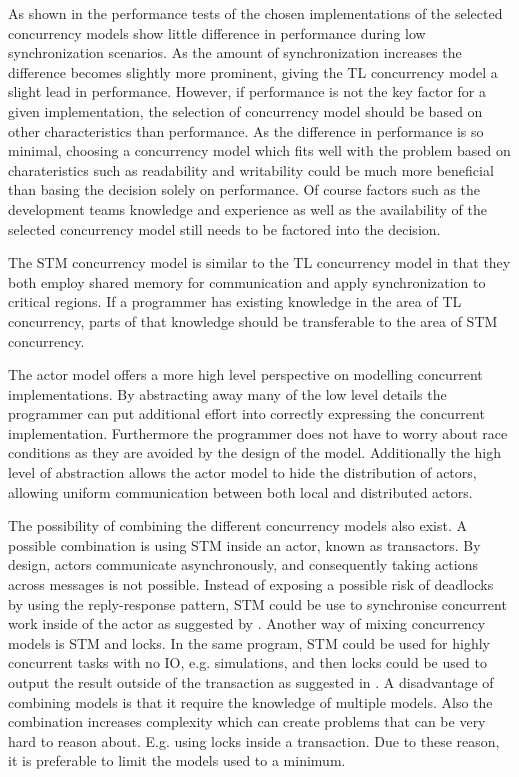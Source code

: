As shown in the performance tests of  the chosen implementations of the selected concurrency models show little difference in performance during low synchronization scenarios. As the amount of synchronization increases the difference becomes slightly more prominent, giving the \ac{TL} concurrency model a slight lead in performance. However, if performance is not the key factor for a given implementation, the selection of concurrency model should be based on other characteristics than performance. As the difference in performance is so minimal, choosing a concurrency model which fits well with the problem based on charateristics such as readability and writability could be much more beneficial than basing the decision solely on performance. Of course factors such as the development teams knowledge and experience as well as the availability of the selected concurrency model still needs to be factored into the decision.

The \ac{STM} concurrency model is similar to the \ac{TL} concurrency model in that they both employ shared memory for communication and apply synchronization to critical regions. If a programmer has existing knowledge in the area of \ac{TL} concurrency, parts of that knowledge should be transferable to the area of \ac{STM} concurrency.

The actor model offers a more high level perspective on modelling concurrent implementations. By abstracting away many of the low level details the programmer can put additional effort into correctly expressing the concurrent implementation. Furthermore the programmer does not have to worry about race conditions as they are avoided by the design of the model. Additionally the high level of abstraction allows the actor model to hide the distribution of actors, allowing uniform communication between both local and distributed actors.

The possibility of combining the different concurrency models also exist. A possible combination is using \ac{STM} inside an actor, known as transactors. By design, actors communicate asynchronously, and consequently taking actions across messages is not possible. Instead of exposing a possible risk of deadlocks by using the reply-response pattern, \ac{STM} could be use to synchronise concurrent work inside of the actor as suggested by \cite{subramaniam2011programming}. Another way of mixing concurrency models is \ac{STM} and locks. In the same program, \ac{STM} could be used for highly concurrent tasks with no \ac{IO}, e.g. simulations, and then locks could be used to output the result outside of the transaction as suggested in \cite{pankratius2009does}. A disadvantage of combining models is that it require the knowledge of multiple models. Also the combination increases complexity which can create problems that can be very hard to reason about. E.g. using locks inside a transaction. Due to these reason, it is preferable to limit the models used to a minimum.

\worksheetend